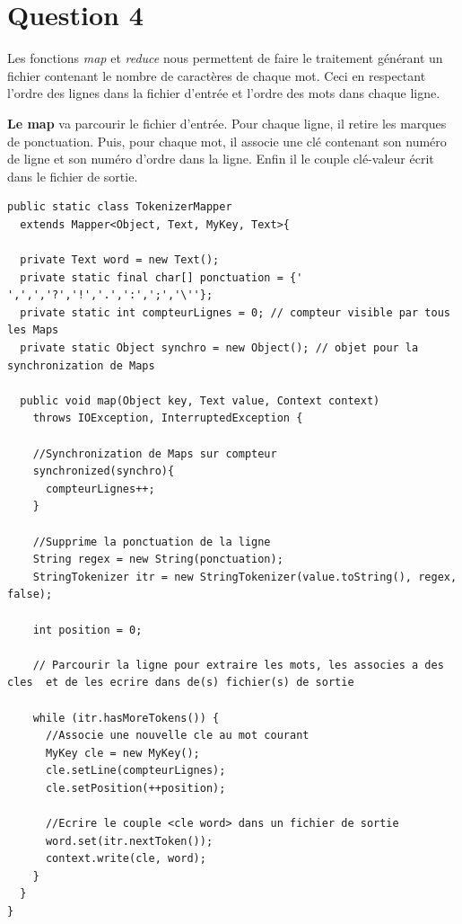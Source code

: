 \documentclass{article}
\begin{document}
  \section*{Question 4}

    Les fonctions {\it map} et {\it reduce} nous permettent de faire le
    traitement générant un fichier contenant le nombre de caractères de chaque
    mot. Ceci en respectant l'ordre des lignes dans la fichier d'entrée et
    l'ordre des mots dans chaque ligne. \medskip

    {\bf Le map} va parcourir le fichier d'entrée. Pour chaque ligne, il retire
    les marques de ponctuation. Puis, pour chaque mot, il associe une clé
    contenant son numéro de ligne et son numéro d'ordre dans la ligne. Enfin il
    le couple clé-valeur écrit dans le fichier de sortie. \medskip

\begin{lstlisting}
public static class TokenizerMapper 
  extends Mapper<Object, Text, MyKey, Text>{
  
  private Text word = new Text();
  private static final char[] ponctuation = {' ',',','?','!','.',':',';','\''};
  private static int compteurLignes = 0; // compteur visible par tous les Maps
  private static Object synchro = new Object(); // objet pour la synchronization de Maps
	    
  public void map(Object key, Text value, Context context)
    throws IOException, InterruptedException {
		
    //Synchronization de Maps sur compteur
    synchronized(synchro){    		
      compteurLignes++;
    }
    	          
    //Supprime la ponctuation de la ligne
    String regex = new String(ponctuation);
    StringTokenizer itr = new StringTokenizer(value.toString(), regex, false);
 		
    int position = 0;
        		
    // Parcourir la ligne pour extraire les mots, les associes a des cles  et de les ecrire dans de(s) fichier(s) de sortie 
		  
    while (itr.hasMoreTokens()) {
      //Associe une nouvelle cle au mot courant
      MyKey cle = new MyKey();
      cle.setLine(compteurLignes);
      cle.setPosition(++position);
        	
      //Ecrire le couple <cle word> dans un fichier de sortie
      word.set(itr.nextToken());
      context.write(cle, word);
    }
  }
}
\end{lstlisting}
\end{document}
